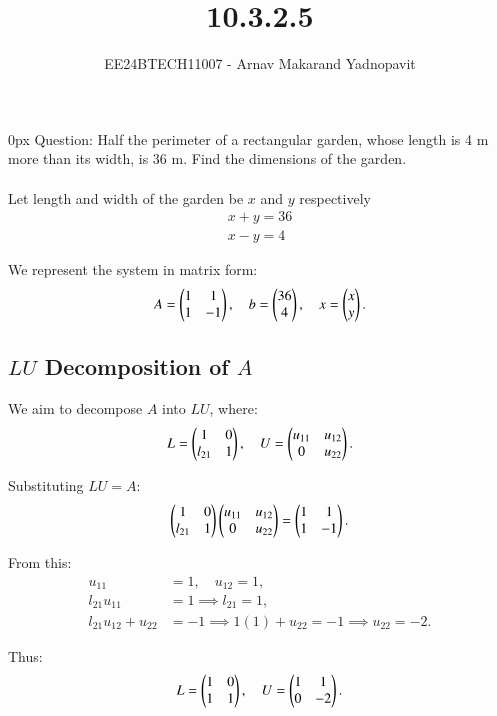 \documentclass[journal,12pt,onecolumn]{IEEEtran}
\theoremstyle{remark}
\begin{document}
\title{10.3.2.5}
\author{EE24BTECH11007 - Arnav Makarand Yadnopavit}
\maketitle
\renewcommand{\thefigure}{\theenumi}
\renewcommand{\thetable}{\theenumi}
\parindent 0px Question: Half the perimeter of a rectangular garden, whose length is 4 m more than its width, is
36 m. Find the dimensions of the garden.\\
\solution\\
Let length and width of the garden be $x$ and $y$ respectively 
\begin{align}
    x+y=36\\
    x-y=4
\end{align}

We represent the system in matrix form:
\begin{align}
A = \begin{pmatrix}1 & 1 \\ 1 & -1\end{pmatrix}, \quad
b = \begin{pmatrix}36 \\ 4\end{pmatrix}, \quad
x = \begin{pmatrix}x \\ y\end{pmatrix}.
\end{align}

\subsection*{$LU$ Decomposition of $A$}
We aim to decompose $A$ into $LU$, where:
\begin{align}
L = \begin{pmatrix}1 & 0 \\ l_{21} & 1\end{pmatrix}, \quad
U = \begin{pmatrix}u_{11} & u_{12} \\ 0 & u_{22}\end{pmatrix}.
\end{align}

Substituting $LU = A$:
\begin{align}
\begin{pmatrix}1 & 0 \\ l_{21} & 1\end{pmatrix}
\begin{pmatrix}u_{11} & u_{12} \\ 0 & u_{22}\end{pmatrix}
=
\begin{pmatrix}1 & 1 \\ 1 & -1\end{pmatrix}.
\end{align}

From this:
\begin{align}
u_{11} &= 1, \quad u_{12} = 1, \\
l_{21}u_{11} &= 1 \implies l_{21} = 1, \\
l_{21}u_{12} + u_{22} &= -1 \implies 1(1) + u_{22} = -1 \implies u_{22} = -2.
\end{align}

Thus:
\begin{align}
L = \begin{pmatrix}1 & 0 \\ 1 & 1\end{pmatrix}, \quad
U = \begin{pmatrix}1 & 1 \\ 0 & -2\end{pmatrix}.
\end{align}
\end{document}
